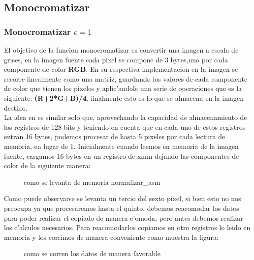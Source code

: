 \subsection{Monocromatizar}
\subsubsection{Monocromatizar $\epsilon = 1$ }
El objetivo de la funcion monocromatizar es convertir una imagen a escala de grises, en la imagen fuente
cada pixel se compone de 3 bytes,uno por cada componente de color \textbf{RGB}. En su respectiva implementacion en 
\C la imagen se recorre linealmente como una matriz, guardando los valores de cada componente de color
que tienen los pixeles y aplic'andole una serie de operaciones que es la siguiente:
\textbf{(R+2*G+B)/4}, finalmente esto es lo que se almacena en la imagen destino.\\
La idea en \ass es similar solo que, aprovechando la capacidad de almacenamiento de los registros de 128 bits
y teniendo en cuenta que en cada uno de estos registros entran 16 bytes, podemos procesar de hasta 5 pixeles
por cada lectura de memoria, en lugar de 1.
Inicialmente cuando leemos en memoria de la imagen fuente, cargamos 16 bytes en un registro de xmm dejando 
las componentes de color de la siguiente manera: \\
\begin{figure}[hb]
\caption{como se levanta de memoria normalizar\_asm}
\label{est:m-uno}
\end{figure}
Como puede observarse se levanta un tercio del sexto pixel, si bien esto no nos preocupa ya que procesaremos
hasta el quinto, debemos reacomodar los datos para poder realizar el copiado de manera c'omoda, pero
antes debemos realizar los c'alculos necesarios. Para reacomodarlos  copiamos en otro registros
lo leido en memoria y los corrimos de manera conveniente como muestra la figura: 
\begin{figure}[hb]
\caption{como se corren los datos de manera favorable}
\label{est:m-uno}
\end{figure}

